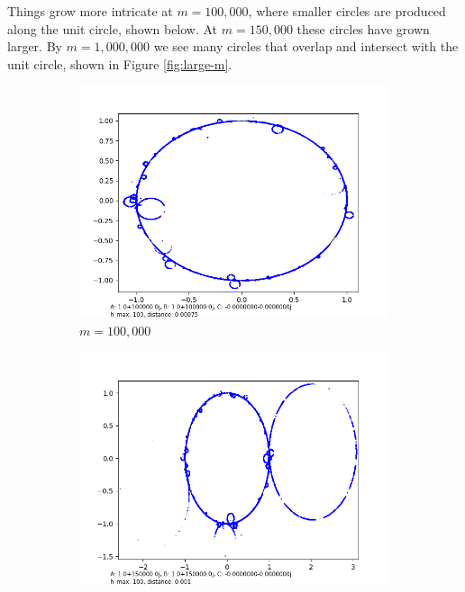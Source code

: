 \documentclass[12pt,a4paper,reqno,parskip=full]{amsart}
\numberwithin{equation}{section}
\theoremstyle{plain}
\theoremstyle{definition}
\begin{document}
Things grow more intricate at $m=100,000$, where smaller circles are produced along the unit circle, shown below. At $m=150,000$ these circles have grown larger. By $m=1,000,000$ we see many circles that overlap and intersect with the unit circle, shown in Figure \ref{fig:large-m}.

\begin{figure}[H]
     \centering
     
     \begin{subfigure}[b]{0.3\textwidth}
         \centering
         \includegraphics[width=\textwidth]{images/m/a100,000,b100,000,h100,d.00075.png}
         \caption{$m=100,000$}
         \label{fig:m100,000}
     \end{subfigure}
     \hfill
     \begin{subfigure}[b]{0.3\textwidth}
         \centering
         \includegraphics[width=\textwidth]{images/m/a150,000,b150,000,h100,d.0010.png}

\end{subfigure}
\end{figure}
\end{document}

